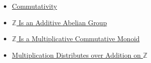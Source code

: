 \begin{dependencies}
\begin{itemize}
  \item \hyperref[def:commutativity]{Commutativity}
  \item \hyperref[thm:z-additive-abelian-group]{$\mathbb{Z}$ Is an Additive Abelian Group}
  \item \hyperref[thm:z-multiplicative-commutative-monoid]{$\mathbb{Z}$ Is a Multiplicative Commutative Monoid}
  \item \hyperref[thm:multiplication-distributes-over-addition-on-z]{Multiplication Distributes over Addition on $\mathbb{Z}$}
\end{itemize}
\end{dependencies}
